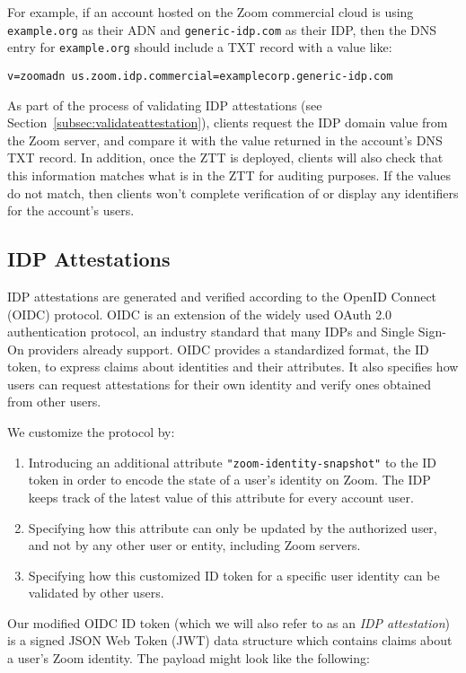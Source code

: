 For example, if an account hosted on the Zoom commercial cloud is using 
\texttt{example.org} as their ADN and \texttt{generic-idp.com} as their IDP,
then the DNS entry for \texttt{example.org} should include a TXT record
with a value like:
\begin{center}
    \texttt{v=zoomadn us.zoom.idp.commercial=examplecorp.generic-idp.com}
\end{center}


As part of the process of validating IDP attestations (see
Section~\ref{subsec:validateattestation}), clients request the IDP domain value
from the Zoom server, and compare it with the value returned in the account's
DNS TXT record. In addition, once the ZTT is deployed, clients will also check
that this information matches what is in the ZTT for auditing purposes. If the
values do not match, then clients won't complete verification of or display any
identifiers for the account's users.

\subsection{IDP Attestations}

IDP attestations are generated and verified according to the OpenID Connect (OIDC) protocol.
OIDC is an extension of the widely used OAuth 2.0 authentication protocol, an industry standard that
many IDPs and Single Sign-On providers already support. OIDC provides a standardized format, the
ID token, to express claims about identities and their attributes. It also specifies how users can
request attestations for their own identity and verify ones obtained from other users.

We customize the protocol by:

\begin{enumerate}
\item Introducing an additional attribute \texttt{"zoom-identity-snapshot"} to the ID token in order
    to encode the state of a user's identity on Zoom. The IDP keeps track of the latest value of
    this attribute for every account user.
\item Specifying how this attribute can only be updated by the authorized user, and not by any other
    user or entity, including Zoom servers.
\item Specifying how this customized ID token for a specific user identity can be validated by other users.
\end{enumerate}

Our modified OIDC ID token (which we will also refer to as an \textit{IDP
attestation}) is a signed JSON Web Token (JWT) data structure which contains
claims about a user’s Zoom identity. The payload might
look like the following:

